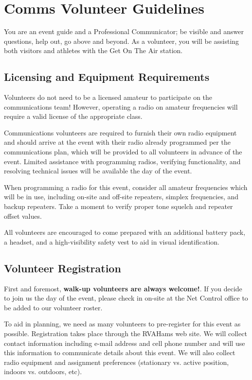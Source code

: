 \documentclass[pdflatex,letterpaper,twoside,12pt]{book}
\begin{document}
\chapter{Comms Volunteer Guidelines}

You are an event guide and a Professional Communicator; be visible and answer questions, help out, go above and beyond.  As a volunteer, you will be assisting both visitors and athletes with the Get On The Air station.

\section{Licensing and Equipment Requirements}

Volunteers do not need to be a licensed amateur to participate on the communications team!  However, operating a radio on amateur frequencies will require a valid license of the appropriate class.

Communications volunteers are required to furnish their own radio equipment and should arrive at the event with their radio already programmed per the communications plan, which will be provided to all volunteers in advance of the event.  Limited assistance with programming radios, verifying functionality, and resolving technical issues will be available the day of the event.

When programming a radio for this event, consider all amateur frequencies which will be in use, including on-site and off-site repeaters, simplex frequencies, and backup repeaters.  Take a moment to verify proper tone squelch and repeater offset values.

All volunteers are encouraged to come prepared with an additional battery pack, a headset, and a high-visibility safety vest to aid in visual identification.


\section{Volunteer Registration}

First and foremost, \textbf{walk-up volunteers are always welcome!}.  If you decide to join us the day of the event, please check in on-site at the Net Control office to be added to our volunteer roster.

To aid in planning, we need as many volunteers to pre-register for this event as possible.  Registration takes place through the RVAHams web site.  We will collect contact information including e-mail address and cell phone number and will use this information to communicate details about this event.  We will also collect radio equipment and assignment preferences (stationary vs. active position, indoors vs. outdoors, etc).
\end{document}
